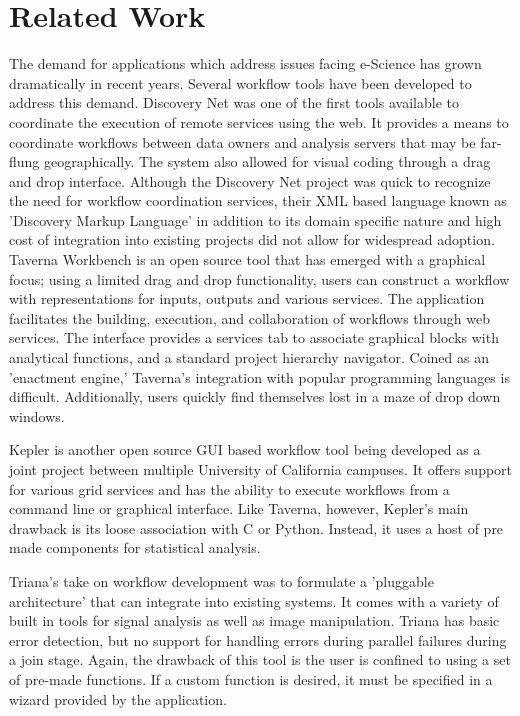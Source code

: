 \section{Related Work}

	The demand for applications which address issues facing e-Science has grown dramatically in recent years. Several workflow tools have been developed to address this demand. Discovery Net \cite{discoNet} was one of the first tools available to coordinate the execution of remote services using the web. It provides a means to coordinate workflows between data owners and analysis servers that may be far-flung geographically. The system also allowed for visual coding through a drag and drop interface. Although the Discovery Net project was quick to recognize the need for workflow coordination services,  their XML based language known as 'Discovery Markup Language' in addition to its domain specific nature and high cost of integration into existing projects did not allow for widespread adoption. 	
	Taverna Workbench \cite{taverna} is an open source tool that has emerged with a graphical focus; using a limited drag and drop functionality, users can construct a workflow with representations for inputs, outputs and various services. The application facilitates the building, execution, and collaboration of workflows through web services. The interface provides a services tab to associate graphical blocks with analytical functions, and a standard project hierarchy navigator. Coined as an 'enactment engine,' Taverna's integration with popular programming languages is difficult. Additionally, users quickly find themselves lost in a maze of drop down windows. 
	
	Kepler \cite{kepler} is another open source GUI based workflow tool being developed as a joint project between multiple University of California campuses. It offers support for various grid services and has the ability to execute workflows from a command line or graphical interface. Like Taverna, however,  Kepler's main drawback is its loose association with C or Python. Instead, it uses a host of pre made components for statistical analysis. 
	
	Triana's \cite{triana} take on workflow development was to formulate a 'pluggable architecture' that can integrate into existing systems. It comes with a variety of built in tools for signal analysis as well as image manipulation. Triana has basic error detection, but no support for handling errors during parallel failures during a join stage. Again, the drawback of this tool is the user is confined to using a set of pre-made functions. If a custom function is desired, it must be specified in a wizard provided by the application. 
	

